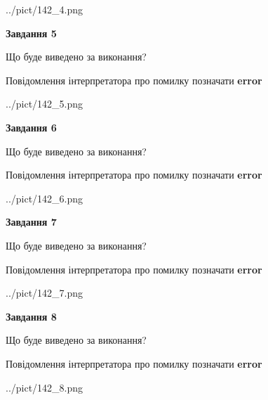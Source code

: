 \documentclass[12pt, ukrainian]{article}
\begin{document}
{\begin{center}
	{../pict/142_4.png}
\end{center}
\newpage

{\begin {center}\textbf{Завдання 5}\end {center}}\par
Що буде виведено за виконання? \par
Повідомлення інтерпретатора про помилку позначати \textbf{error}

\begin{center}
	{../pict/142_5.png}
\end{center}
\newpage

{\begin {center}\textbf{Завдання 6}\end {center}}\par
Що буде виведено за виконання? \par
Повідомлення інтерпретатора про помилку позначати \textbf{error}

\begin{center}
	{../pict/142_6.png}
\end{center}
\newpage

{\begin {center}\textbf{Завдання 7}\end {center}}\par
Що буде виведено за виконання? \par
Повідомлення інтерпретатора про помилку позначати \textbf{error}

\begin{center}
	{../pict/142_7.png}
\end{center}
\newpage

{\begin {center}\textbf{Завдання 8}\end {center}}\par
Що буде виведено за виконання? \par
Повідомлення інтерпретатора про помилку позначати \textbf{error}

\begin{center}
	{../pict/142_8.png}
\end{center}
\newpage

}
\end{document}
